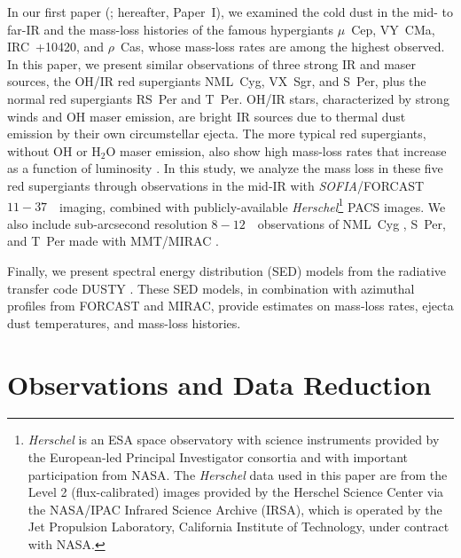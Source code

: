 \documentclass[modern]{aastex61}
\newcommand{\SOFIA}{{\it SOFIA}}
\begin{document}
In our first paper (\citealt{shenoy2016}; hereafter, Paper~I), we examined the cold dust in the mid- to far-IR and the mass-loss histories of the famous hypergiants $\mu$~Cep, VY~CMa, IRC~+10420, and $\rho$~Cas, whose mass-loss rates are among the highest observed. In this paper, we present similar observations of three strong IR and maser sources, the OH/IR red supergiants NML~Cyg, VX~Sgr, and S~Per, plus the normal red supergiants RS~Per and T~Per. OH/IR stars, characterized by strong winds and OH maser emission, are bright IR sources due to thermal dust emission by their own circumstellar ejecta.  The more typical red supergiants, without OH or H$_2$O maser emission, also show high mass-loss rates that increase as a function of luminosity \citep{reimers1975,dejager1988,mauron2011}. In this study, we analyze the mass loss in these five red supergiants through observations in the mid-IR with \SOFIA/FORCAST \citep{herter2012} $11-37$~\micron\ imaging, combined with publicly-available \textit{Herschel}\footnote{\textit{Herschel} is an ESA space observatory with science instruments provided by the European-led Principal Investigator consortia and with important participation from NASA. The \textit{Herschel} data used in this paper are from the Level 2 (flux-calibrated) images provided by the Herschel Science Center via the NASA/IPAC Infrared Science Archive (IRSA), which is operated by the Jet Propulsion Laboratory, California Institute of Technology, under contract with NASA.} \citep{pilbratt2010} PACS \citep{poglitsch2010} images. We also include sub-arcsecond resolution $8-12$~\micron\ observations of NML~Cyg \citep{schuster2009}, S~Per, and T~Per made with MMT/MIRAC \citep{hoffmann1998,hinz2000}.

Finally, we present spectral energy distribution (SED) models from the radiative transfer code DUSTY \citep{ivezic1997}. These SED models, in combination with azimuthal profiles from FORCAST and MIRAC, provide estimates on mass-loss rates, ejecta dust temperatures, and mass-loss histories.

\section{Observations and Data Reduction}
\end{document}
